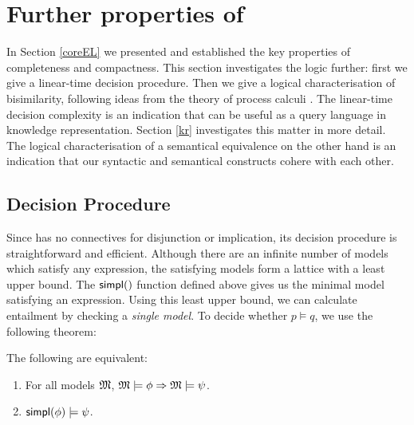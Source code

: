 \section{Further properties of \ELFULL{}}

In Section \ref{coreEL} we presented \ELABR{}
and established the key properties of completeness and compactness.
This section investigates
the logic further: first we give a linear-time decision
procedure. Then we give a logical characterisation of bisimilarity,
following ideas from the theory of process calculi
\cite{HennessyM:alglawfndac}.  The linear-time decision complexity is
an indication that \ELABR{} can be useful as a query language in
knowledge representation. Section \ref{kr} investigates this matter in
more detail. The logical characterisation of a semantical equivalence
on the other hand is an indication that our syntactic and semantical
constructs cohere with each other.

\subsection{Decision Procedure}
\label{decisionprocedure}
\NI Since \ELABR{} has no connectives for disjunction or implication, its
decision procedure is straightforward and efficient.  Although there
are an infinite number of models which satisfy any expression, the
satisfying models form a lattice with a least upper bound.  The $\SIMPL$
function defined above gives us the minimal model satisfying an
expression.  Using this least upper bound, we can calculate entailment
by checking a \emph{single model}.  To decide whether $p \models q$,
we use the following theorem:

\begin{theorem}\label{theorem:decision}
  The following are equivalent:
  \begin{enumerate}
    \item\label{theorem:decision:1} For all models $\frak{M}$,  $\frak{M} \models \phi \Rightarrow \frak{M} \models \psi$.
    \item\label{theorem:decision:2} $\mathsf{simpl}(\phi) \models \psi$.
  \end{enumerate}
\end{theorem}

